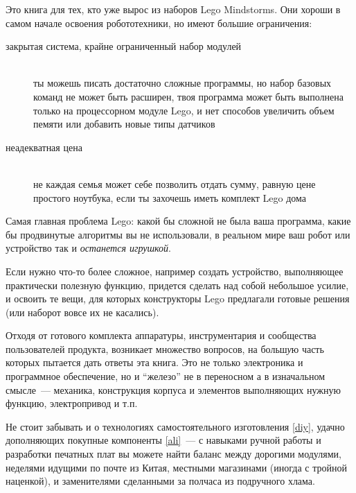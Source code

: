 \clearpage{}\secdown

\noindent
Это книга для тех, кто уже вырос из наборов Lego Mindstorms.
Они хороши в самом начале освоения робототехники, но имеют большие
ограничения:

\begin{description}

\item[закрытая система, крайне ограниченный набор модулей]\ \\ты можешь писать
достаточно сложные программы, но набор базовых команд не может быть расширен,
твоя программа может быть выполнена только на процессорном модуле Lego, и нет
способов увеличить объем пемяти или добавить новые типы датчиков

\item[неадекватная цена]\ \\не каждая семья может себе позволить отдать сумму,
равную цене простого ноутбука, если ты захочешь иметь комплект Lego дома

\end{description}
\clearpage

Самая главная проблема Lego: какой бы сложной не была ваша программа, какие бы
продвинутые алгоритмы вы не использовали, в реальном мире ваш робот или
устройство так и \textit{останется игрушкой}.


Если нужно что-то более сложное, например создать устройство, выполняющее
практически полезную функцию, придется сделать над собой небольшое усилие, и
освоить те вещи, для которых конструкторы Lego предлагали готовые решения (или
наборот вовсе их не касались).

Отходя от готового комплекта аппаратуры, инструментария и сообщества
пользователей продукта, возникает множество вопросов, на больш\textit{у}ю часть
которых пытается дать ответы эта книга. Это не только электроника и программное
обеспечение, но и ``железо'' не в переносном а в изначальном смысле\ ---
механика, конструкция корпуса и элементов выполняющих нужную функцию,
электропривод и т.п.

Не стоит забывать и о технологиях самостоятельного изготовления \ref{diy},
удачно дополняющих покупные компоненты \ref{ali}\ --- с навыками ручной работы и
разработки печатных плат вы можете найти баланс между дорогими модулями,
неделями идущими по почте из Китая, местными магазинами (иногда с тройной
наценкой), и заменителями сделанными за полчаса из подручного хлама.

\secup
